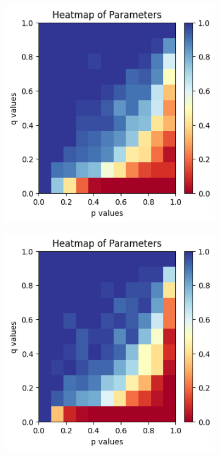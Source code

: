 \documentclass[psamsfonts]{amsart}
\theoremstyle{definition}
\theoremstyle{remark}
\numberwithin{equation}{section}
\begin{document}
\begin{figure}[h]
     \centering
     \begin{subfigure}{0.45\textwidth}
         \centering
         \includegraphics[width=\linewidth]{./Figures/size 30 heatmap 2.png}
         \label{fig:1a}
     \end{subfigure}
     \begin{subfigure}{0.45\textwidth}
         \centering
         \includegraphics[width=\linewidth]{./Figures/size 50 heatmap.png}

\end{subfigure}
\end{figure}
\end{document}

